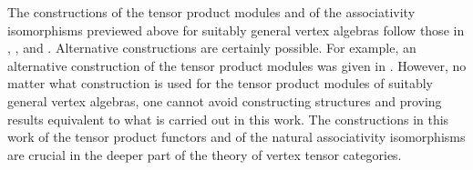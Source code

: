 \documentclass[12pt]{article}
\begin{document}
\begin{rema}{\rm
The constructions of the tensor product modules and of the
associativity isomorphisms previewed above for suitably general vertex
algebras follow those in \cite{tensor1}, \cite{tensor2},
\cite{tensor3} and \cite{tensor4}.  Alternative constructions are
certainly possible.  For example, an alternative construction of the
tensor product modules was given in \cite{Li}.  However, no matter
what construction is used for the tensor product modules of suitably
general vertex algebras, one cannot avoid constructing structures and
proving results equivalent to what is carried out in this work.  The
constructions in this work of the tensor product functors and of the
natural associativity isomorphisms are crucial in the deeper part of
the theory of vertex tensor categories. }
\end{rema}
\end{document}
